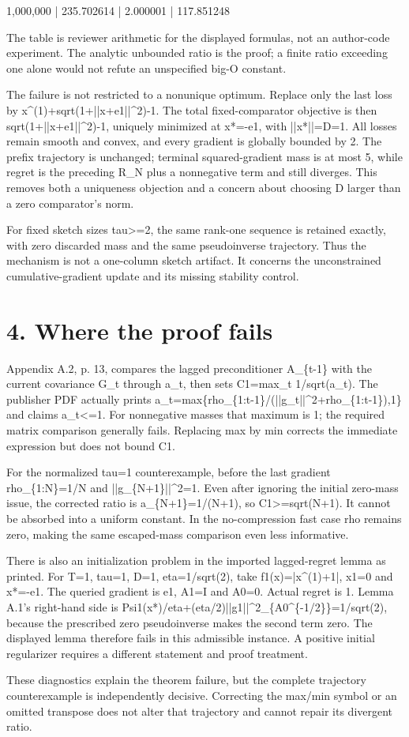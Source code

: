 \documentclass[10pt]{article}
\begin{document}
1,000,000 | 235.702614 | 2.000001 | 117.851248\par
The table is reviewer arithmetic for the displayed formulas, not an author-code experiment. The analytic unbounded ratio is the proof; a finite ratio exceeding one alone would not refute an unspecified big-O constant.\par
The failure is not restricted to a nonunique optimum. Replace only the last loss by x\textasciicircum{}(1)+sqrt(1+||x+e1||\textasciicircum{}2)-1. The total fixed-comparator objective is then sqrt(1+||x+e1||\textasciicircum{}2)-1, uniquely minimized at x*=-e1, with ||x*||=D=1. All losses remain smooth and convex, and every gradient is globally bounded by 2. The prefix trajectory is unchanged; terminal squared-gradient mass is at most 5, while regret is the preceding R\_N plus a nonnegative term and still diverges. This removes both a uniqueness objection and a concern about choosing D larger than a zero comparator’s norm.\par
For fixed sketch sizes tau>=2, the same rank-one sequence is retained exactly, with zero discarded mass and the same pseudoinverse trajectory. Thus the mechanism is not a one-column sketch artifact. It concerns the unconstrained cumulative-gradient update and its missing stability control.\par
\section*{4. Where the proof fails}
Appendix A.2, p. 13, compares the lagged preconditioner A\_\{t-1\} with the current covariance G\_t through a\_t, then sets C1=max\_t 1/sqrt(a\_t). The publisher PDF actually prints a\_t=max\{rho\_\{1:t-1\}/(||g\_t||\textasciicircum{}2+rho\_\{1:t-1\}),1\} and claims a\_t<=1. For nonnegative masses that maximum is 1; the required matrix comparison generally fails. Replacing max by min corrects the immediate expression but does not bound C1.\par
For the normalized tau=1 counterexample, before the last gradient rho\_\{1:N\}=1/N and ||g\_\{N+1\}||\textasciicircum{}2=1. Even after ignoring the initial zero-mass issue, the corrected ratio is a\_\{N+1\}=1/(N+1), so C1>=sqrt(N+1). It cannot be absorbed into a uniform constant. In the no-compression fast case rho remains zero, making the same escaped-mass comparison even less informative.\par
There is also an initialization problem in the imported lagged-regret lemma as printed. For T=1, tau=1, D=1, eta=1/sqrt(2), take f1(x)=|x\textasciicircum{}(1)+1|, x1=0 and x*=-e1. The queried gradient is e1, A1=I and A0=0. Actual regret is 1. Lemma A.1’s right-hand side is Psi1(x*)/eta+(eta/2)||g1||\textasciicircum{}2\_\{A0\textasciicircum{}\{-1/2\}\}=1/sqrt(2), because the prescribed zero pseudoinverse makes the second term zero. The displayed lemma therefore fails in this admissible instance. A positive initial regularizer requires a different statement and proof treatment.\par
These diagnostics explain the theorem failure, but the complete trajectory counterexample is independently decisive. Correcting the max/min symbol or an omitted transpose does not alter that trajectory and cannot repair its divergent ratio.\par
\end{document}
